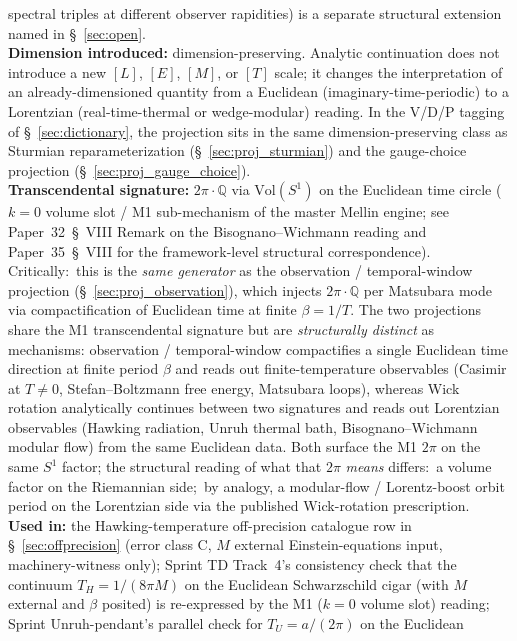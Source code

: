\documentclass[11pt]{article}
\begin{document}
spectral triples at different observer rapidities) is a separate
structural extension named in \S~\ref{sec:open}.\\
\textbf{Dimension introduced:} dimension-preserving.  Analytic
continuation does not introduce a new $[L]$, $[E]$, $[M]$, or $[T]$
scale; it changes the interpretation of an already-dimensioned
quantity from a Euclidean (imaginary-time-periodic) to a Lorentzian
(real-time-thermal or wedge-modular) reading.  In the V/D/P tagging
of \S~\ref{sec:dictionary}, the projection sits in the same
dimension-preserving class as Sturmian reparameterization
(\S~\ref{sec:proj_sturmian}) and the gauge-choice projection
(\S~\ref{sec:proj_gauge_choice}).\\
\textbf{Transcendental signature:} $2\pi \cdot \mathbb{Q}$ via
$\mathrm{Vol}(S^1)$ on the Euclidean time circle ($k = 0$ volume slot /
M1 sub-mechanism of the master Mellin engine; see Paper~32~\S~VIII
Remark on the Bisognano--Wichmann reading and Paper~35~\S~VIII for
the framework-level structural correspondence).  Critically:\ this
is the \emph{same generator} as the observation / temporal-window
projection (\S~\ref{sec:proj_observation}), which injects
$2\pi \cdot \mathbb{Q}$ per Matsubara mode via compactification of
Euclidean time at finite $\beta = 1/T$.  The two projections share
the M1 transcendental signature but are \emph{structurally distinct}
as mechanisms: observation / temporal-window compactifies a single
Euclidean time direction at finite period $\beta$ and reads out
finite-temperature observables (Casimir at $T \neq 0$,
Stefan--Boltzmann free energy, Matsubara loops), whereas Wick
rotation analytically continues between two signatures and reads out
Lorentzian observables (Hawking radiation, Unruh thermal bath,
Bisognano--Wichmann modular flow) from the same Euclidean data.
Both surface the M1 $2\pi$ on the same $S^1$ factor;
the structural reading of what that $2\pi$ \emph{means} differs:\
a volume factor on the Riemannian side;\ by analogy, a
modular-flow / Lorentz-boost orbit period on the Lorentzian side
via the published Wick-rotation prescription.\\
\textbf{Used in:} the Hawking-temperature off-precision catalogue
row in \S~\ref{sec:offprecision} (error class C, $M$ external
Einstein-equations input, machinery-witness only); Sprint TD Track~4's
consistency check that the continuum $T_H = 1/(8\pi M)$ on the
Euclidean Schwarzschild cigar (with $M$ external and $\beta$ posited)
is re-expressed by the M1 ($k = 0$ volume slot) reading; Sprint
Unruh-pendant's parallel check for $T_U = a/(2\pi)$ on the Euclidean
\end{document}
